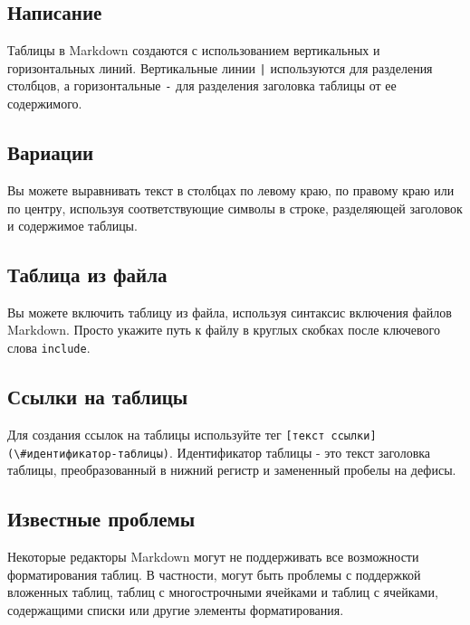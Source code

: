 \documentclass[a4paper]{article}
\newcommand{\passthrough}[1]{{\codefont #1}}
\begin{document}
\subsection{Написание}\label{ux43dux430ux43fux438ux441ux430ux43dux438ux435}

Таблицы в Markdown создаются с использованием вертикальных и
горизонтальных линий. Вертикальные линии \passthrough{\lstinline!|!}
используются для разделения столбцов, а горизонтальные
\passthrough{\lstinline!-!} для разделения заголовка таблицы от ее
содержимого.

\subsection{Вариации}\label{ux432ux430ux440ux438ux430ux446ux438ux438}

Вы можете выравнивать текст в столбцах по левому краю, по правому краю
или по центру, используя соответствующие символы в строке, разделяющей
заголовок и содержимое таблицы.

\subsection{Таблица из
файла}\label{ux442ux430ux431ux43bux438ux446ux430-ux438ux437-ux444ux430ux439ux43bux430}

Вы можете включить таблицу из файла, используя синтаксис включения
файлов Markdown. Просто укажите путь к файлу в круглых скобках после
ключевого слова \passthrough{\lstinline!include!}.

\subsection{Ссылки на
таблицы}\label{ux441ux441ux44bux43bux43aux438-ux43dux430-ux442ux430ux431ux43bux438ux446ux44b}

Для создания ссылок на таблицы используйте тег
\passthrough{\lstinline![текст ссылки](\#идентификатор-таблицы)!}.
Идентификатор таблицы - это текст заголовка таблицы, преобразованный в
нижний регистр и замененный пробелы на дефисы.

\subsection{Известные
проблемы}\label{ux438ux437ux432ux435ux441ux442ux43dux44bux435-ux43fux440ux43eux431ux43bux435ux43cux44b-3}

Некоторые редакторы Markdown могут не поддерживать все возможности
форматирования таблиц. В частности, могут быть проблемы с поддержкой
вложенных таблиц, таблиц с многострочными ячейками и таблиц с ячейками,
содержащими списки или другие элементы форматирования.
\end{document}
